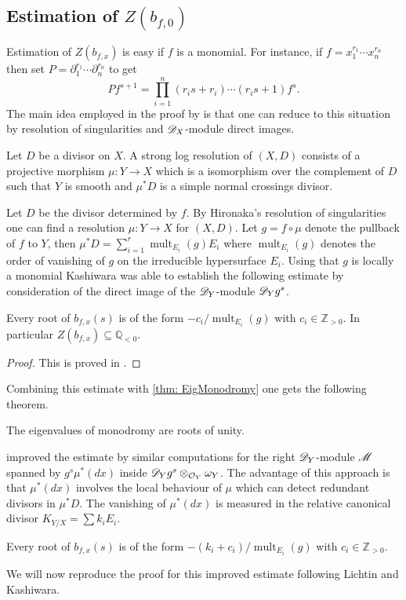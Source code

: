 \subsection{Estimation of $Z(b_{f,0})$}
Estimation of $Z(b_{f,x})$ is easy if $f$ is a monomial.
For instance, if $f = x_1^{r_1}\cdots x_n^{r_n}$ then set $P = \partial_1^{r_1}\cdots \partial_n^{r_n}$ to get
$$P f^{s+1} = \prod_{i=1}^n (r_i s + r_i)\cdots (r_i s + 1) f^{s}. $$
The main idea employed in the proof by \cite{kashiwara1976b} is that one can reduce to this situation by resolution of singularities and $\mathscr{D}_X$-module direct images.
\begin{definition}
  Let $D$ be a divisor on $X$. A strong log resolution of $(X,D)$ consists of a projective morphism $\mu:Y\to X$ which is a isomorphism over the complement of $D$ such that $Y$ is smooth and $\mu^*D$ is a simple normal crossings divisor.
\end{definition}
Let $D$ be the divisor determined by $f$.
By Hironaka's resolution of singularities one can find a resolution $\mu:Y\to X$ for $(X,D)$.
Let $g = f\circ \mu$ denote the pullback of $f$ to $Y$, then $\mu^*D = \sum_{i=1}^r \operatorname{mult}_{E_i}(g) E_i$ where $\operatorname{mult}_{E_i}(g)$ denotes the order of vanishing of $g$ on the irreducible hypersurface $E_i$.
Using that $g$ is locally a monomial Kashiwara was able to establish the following estimate by consideration of the direct image of the $\mathscr{D}_Y$-module $\mathscr{D}_Y g^s$.
\begin{theorem}
  Every root of $b_{f,x}(s)$ is of the form $ -c_i/\operatorname{mult}_{E_i}(g) $ with $c_i\in \mathbb{Z}_{>0}$.
  In particular $Z(b_{f,x})\subseteq \mathbb{Q}_{<0}$.
\end{theorem}
\begin{proof}
  This is proved in \cite{kashiwara1976b}.
\end{proof}
Combining this estimate with \cref{thm: EigMonodromy} one gets the following theorem.
\begin{theorem}
  The eigenvalues of monodromy are roots of unity.
\end{theorem}
\cite{lichtin1989poles} improved the estimate by similar computations for the right $\mathscr{D}_Y$-module $\mathscr{M}$ spanned by $ g^s \mu^*(dx)$ inside $\mathscr{D}_Yg^s\otimes_{\mathcal{O}_Y} \omega_Y$.
The advantage of this approach is that $\mu^*(dx)$ involves the local behaviour of $\mu$ which can detect redundant divisors in $\mu^*D$.
The vanishing of $\mu^*(dx)$ is measured in the relative canonical divisor $K_{Y/X} = \sum k_i E_i$.
\begin{theorem}\label{thm: LichtinEstimate}
  Every root of $b_{f,x}(s)$ is of the form $-(k_i + c_i)/\operatorname{mult}_{E_i}(g)$ with $c_i\in \mathbb{Z}_{>0}$.
\end{theorem}
We will now reproduce the proof for this improved estimate following Lichtin and Kashiwara.
\\

